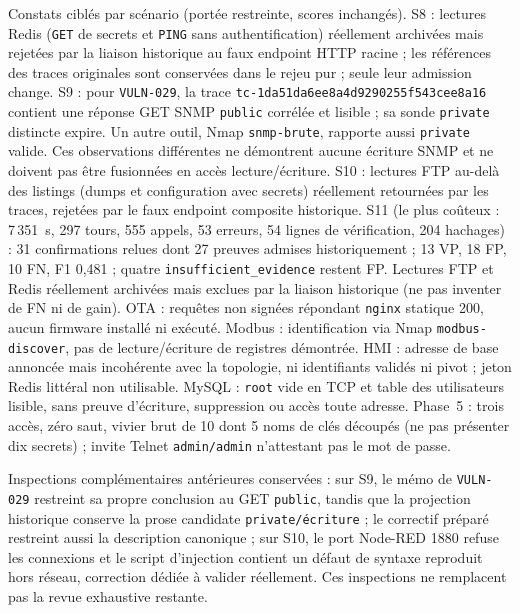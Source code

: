\documentclass[11pt,a4paper]{article}
\newcommand{\code}[1]{{\urlstyle{tt}\nolinkurl{#1}}}
\begin{document}
Constats ciblés par sc\'enario (port\'ee restreinte, scores inchang\'es). S8 : lectures Redis (\code{GET} de secrets et \code{PING} sans authentification) r\'eellement archiv\'ees mais rejet\'ees par la liaison historique au faux endpoint HTTP racine ; les références des traces originales sont conservées dans le rejeu pur ; seule leur admission change. S9 : pour \code{VULN-029}, la trace \code{tc-1da51da6ee8a4d9290255f543cee8a16} contient une réponse GET SNMP \code{public} corrélée et lisible ; sa sonde \code{private} distincte expire. Un autre outil, Nmap \code{snmp-brute}, rapporte aussi \code{private} valide. Ces observations différentes ne démontrent aucune écriture SNMP et ne doivent pas être fusionnées en accès lecture/écriture. S10 : lectures FTP au-del\`a des listings (dumps et configuration avec secrets) r\'eellement retourn\'ees par les traces, rejet\'ees par le faux endpoint composite historique. S11 (le plus co\^uteux : 7\,351~s, 297 tours, 555 appels, 53 erreurs, 54 lignes de v\'erification, 204 hachages) : 31 confirmations relues dont 27 preuves admises historiquement ; 13 VP, 18 FP, 10 FN, F1 0,481 ; quatre \code{insufficient_evidence} restent FP. Lectures FTP et Redis r\'eellement archiv\'ees mais exclues par la liaison historique (ne pas inventer de FN ni de gain). OTA : requ\^etes non sign\'ees r\'epondant \code{nginx} statique 200, aucun firmware install\'e ni ex\'ecut\'e. Modbus : identification via Nmap \code{modbus-discover}, pas de lecture/écriture de registres démontrée. HMI : adresse de base annoncée mais incohérente avec la topologie, ni identifiants valid\'es ni pivot ; jeton Redis litt\'eral non utilisable. MySQL : \code{root} vide en TCP et table des utilisateurs lisible, sans preuve d'\'ecriture, suppression ou acc\`es toute adresse. Phase~5 : trois acc\`es, z\'ero saut, vivier brut de 10 dont 5 noms de cl\'es d\'ecoup\'es (ne pas pr\'esenter dix secrets) ; invite Telnet \code{admin/admin} n'attestant pas le mot de passe.

Inspections compl\'ementaires ant\'erieures conserv\'ees : sur S9, le mémo de \code{VULN-029} restreint sa propre conclusion au GET \code{public}, tandis que la projection historique conserve la prose candidate \code{private/écriture} ; le correctif préparé restreint aussi la description canonique ; sur S10, le port Node-RED 1880 refuse les connexions et le script d'injection contient un d\'efaut de syntaxe reproduit hors r\'eseau, correction d\'edi\'ee \`a valider r\'eellement. Ces inspections ne remplacent pas la revue exhaustive restante.
\end{document}
